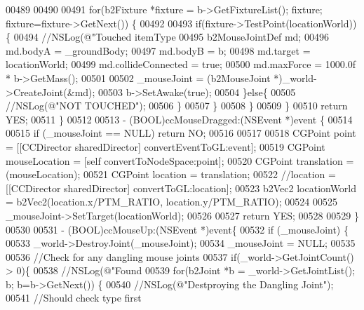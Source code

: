 \begin{DoxyCode}
{{{{{{{{00489             
00490             
00491             \textcolor{keywordflow}{for}(b2Fixture *fixture = b->GetFixtureList(); fixture; fixture=fixture->GetNext()) \{
00492                 
00493                 \textcolor{keywordflow}{if}(fixture->TestPoint(locationWorld))\{
00494                     \textcolor{comment}{//NSLog(@"Touched itemType %
00495                     b2MouseJointDef md;
00496                     md.bodyA = \_groundBody;
00497                     md.bodyB = b;
00498                     md.target = locationWorld;
00499                     md.collideConnected = \textcolor{keyword}{true};
00500                     md.maxForce = 1000.0f * b->GetMass();
00501                     
00502                     \_mouseJoint = (b2MouseJoint *)\_world->CreateJoint(&md);
00503                     b->SetAwake(\textcolor{keyword}{true});
00504                 \}\textcolor{keywordflow}{else}\{
00505                     \textcolor{comment}{//NSLog(@"NOT TOUCHED");}
00506                 \}
00507             \}
00508         \}
00509     \}
00510     \textcolor{keywordflow}{return} YES;
00511 \}
00512 
00513 - (BOOL)ccMouseDragged:(NSEvent *)event \{
00514     
00515     \textcolor{keywordflow}{if} (\_mouseJoint == NULL) \textcolor{keywordflow}{return} NO;
00516     
00517 
00518     CGPoint point = [[CCDirector sharedDirector] convertEventToGL:event];
00519     CGPoint mouseLocation = [\textcolor{keyword}{self} convertToNodeSpace:point];
00520     CGPoint translation = (mouseLocation);
00521     CGPoint location = translation;
00522     \textcolor{comment}{//location = [[CCDirector sharedDirector] convertToGL:location];}
00523     b2Vec2 locationWorld = b2Vec2(location.x/PTM\_RATIO, location.y/PTM\_RATIO);
00524     
00525     \_mouseJoint->SetTarget(locationWorld);
00526     
00527     \textcolor{keywordflow}{return} YES;
00528     
00529 \}
00530 
00531 - (BOOL)ccMouseUp:(NSEvent *)event\{
00532     \textcolor{keywordflow}{if} (\_mouseJoint) \{
00533         \_world->DestroyJoint(\_mouseJoint);
00534         \_mouseJoint = NULL;
00535         
00536         \textcolor{comment}{//Check for any dangling mouse joints}
00537         \textcolor{keywordflow}{if}(\_world->GetJointCount() > 0)\{
00538             \textcolor{comment}{//NSLog(@"Found %
00539             \textcolor{keywordflow}{for}(b2Joint *b = \_world->GetJointList(); b; b=b->GetNext()) \{
00540                 \textcolor{comment}{//NSLog(@"Destproying the Dangling Joint");}
00541                 \textcolor{comment}{//Should check type first}
}}}}}}}}}}
\end{DoxyCode}
